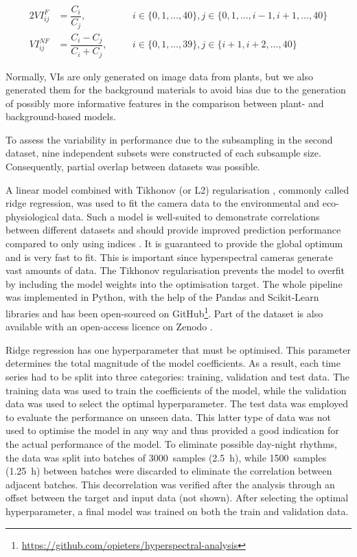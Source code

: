         \begin{alignat}{2}
            VI^{F}_{ij} &= \dfrac{C_i}{C_j},            &\quad&i \in\{0,1,\ldots,40\}, j \in \{0,1,\ldots,i-1,i+1,\ldots,40\} \label{vi1} \\
            VI^{NF}_{ij} &= \dfrac{C_i - C_j}{C_i+C_j}, &&i \in\{0,1,\ldots,39\}, j \in \{i+1, i+2, \ldots,40\} \label{vi2}
        \end{alignat}
        
        Normally, VIs are only generated on image data from plants, but we also generated them for the background materials to avoid bias due to the generation of possibly more informative features in the comparison between plant- and background-based models.
        
        To assess the variability in performance due to the subsampling in the second dataset, nine independent subsets were constructed of each subsample size. Consequently, partial overlap between datasets was possible.
        
        A linear model combined with Tikhonov (or L2) regularisation \citep{tikhonovSolution1963}, commonly called ridge regression, was used to fit the camera data to the environmental and eco-physiological data. Such a model is well-suited to demonstrate correlations between different datasets and should provide improved prediction performance compared to only using indices \citep{yendrekHighThroughput2017}. It is guaranteed to provide the global optimum and is very fast to fit. This is important since hyperspectral cameras generate vast amounts of data. The Tikhonov regularisation prevents the model to overfit by including the model weights into the optimisation target. 
        The whole pipeline was implemented in Python, with the help of the Pandas \citep{mckinneyData2010,mckinneyPandas2011} and Scikit-Learn \citep{pedregosaScikitlearn2011} libraries and has been open-sourced on GitHub\footnote{\url{https://github.com/opieters/hyperspectral-analysis}}. Part of the dataset is also available with an open-access licence on Zenodo \citep{pieters2020}.
        
        Ridge regression has one hyperparameter that must be optimised. This parameter determines the total magnitude of the model coefficients. As a result, each time series had to be split into three categories: training, validation and test data. The training data was used to train the coefficients of the model, while the validation data was used to select the optimal hyperparameter. The test data was employed to evaluate the performance on unseen data. This latter type of data was not used to optimise the model in any way and thus provided a good indication for the actual performance of the model. To eliminate possible day-night rhythms, the data was split into batches of 3000~samples (\SI{2.5}{\hour}), while 1500~samples (\SI{1.25}{\hour}) between batches were discarded to eliminate the correlation between adjacent batches. This decorrelation was verified after the analysis through an offset between the target and input data (not shown). After selecting the optimal hyperparameter, a final model was trained on both the train and validation data.
        
